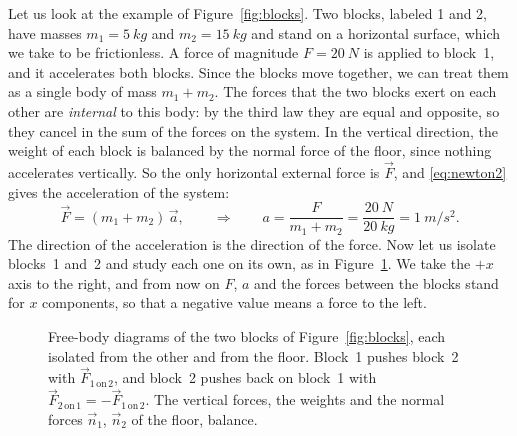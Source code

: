 \documentclass[11pt,a4paper]{article}
\newcommand{\on}[2]{#1\,\mathrm{on}\,#2}   %
\begin{document}
Let us look at the example of Figure~\ref{fig:blocks}. Two blocks, labeled 1 and 2, have masses
$m_1 = \qty{5}{kg}$ and $m_2 = \qty{15}{kg}$ and stand on a horizontal surface, which we take to be
frictionless. A force of magnitude $F = \qty{20}{N}$ is applied to block~1, and it accelerates both
blocks. Since the blocks move together, we can treat them as a single body of mass $m_1+m_2$. The
forces that the two blocks exert on each other are \emph{internal} to this body: by the third law
they are equal and opposite, so they cancel in the sum of the forces on the system. In the vertical
direction, the weight of each block is balanced by the normal force of the floor, since nothing
accelerates vertically. So the only horizontal external force is $\vec{F}$, and \eqref{eq:newton2}
gives the acceleration of the system:
\begin{equation}\label{eq:blocks-a}
  \vec{F} = (m_1 + m_2)\,\vec{a} , \qquad \Rightarrow \qquad
  a = \frac{F}{m_1 + m_2} = \frac{\qty{20}{N}}{\qty{20}{kg}} = \qty{1}{m/s^2} .
\end{equation}
The direction of the acceleration is the direction of the force. Now let us isolate blocks~1 and~2
and study each one on its own, as in Figure~\ref{fig:blocks-fbd}. We take the $+x$ axis to the
right, and from now on $F$, $a$ and the forces between the blocks stand for $x$ components, so that
a negative value means a force to the left.

\begin{figure}[ht]
\centering
{}
\caption{Free-body diagrams of the two blocks of Figure~\ref{fig:blocks}, each isolated from the
other and from the floor. Block~1 pushes block~2 with $\vec{F}_{\on{1}{2}}$, and block~2 pushes
back on block~1 with $\vec{F}_{\on{2}{1}} = -\vec{F}_{\on{1}{2}}$. The vertical forces, the
weights and the normal forces $\vec{n}_1$, $\vec{n}_2$ of the floor, balance.}\label{fig:blocks-fbd}
\end{figure}
\end{document}
